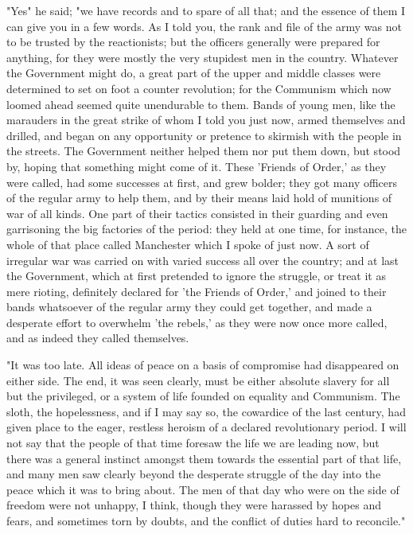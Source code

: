 "Yes" he said; "we have records and to spare of all that; and the
essence of them I can give you in a few words. As I told you, the rank
and file of the army was not to be trusted by the reactionists; but the
officers generally were prepared for anything, for they were mostly the
very stupidest men in the country. Whatever the Government might do, a
great part of the upper and middle classes were determined to set on
foot a counter revolution; for the Communism which now loomed ahead
seemed quite unendurable to them. Bands of young men, like the marauders
in the great strike of whom I told you just now, armed themselves and
drilled, and began on any opportunity or pretence to skirmish with the
people in the streets. The Government neither helped them nor put them
down, but stood by, hoping that something might come of it. These
'Friends of Order,' as they were called, had some successes at first,
and grew bolder; they got many officers of the regular army to help
them, and by their means laid hold of munitions of war of all kinds. One
part of their tactics consisted in their guarding and even garrisoning
the big factories of the period: they held at one time, for instance,
the whole of that place called Manchester which I spoke of just now. A
sort of irregular war was carried on with varied success all over the
country; and at last the Government, which at first pretended to ignore
the struggle, or treat it as mere rioting, definitely declared for 'the
Friends of Order,' and joined to their bands whatsoever of the regular
army they could get together, and made a desperate effort to overwhelm
'the rebels,' as they were now once more called, and as indeed they
called themselves.

"It was too late. All ideas of peace on a basis of compromise had
disappeared on either side. The end, it was seen clearly, must be either
absolute slavery for all but the privileged, or a system of life founded
on equality and Communism. The sloth, the hopelessness, and if I may say
so, the cowardice of the last century, had given place to the eager,
restless heroism of a declared revolutionary period. I will not say that
the people of that time foresaw the life we are leading now, but there
was a general instinct amongst them towards the essential part of that
life, and many men saw clearly beyond the desperate struggle of the day
into the peace which it was to bring about. The men of that day who were
on the side of freedom were not unhappy, I think, though they were
harassed by hopes and fears, and sometimes torn by doubts, and the
conflict of duties hard to reconcile."

